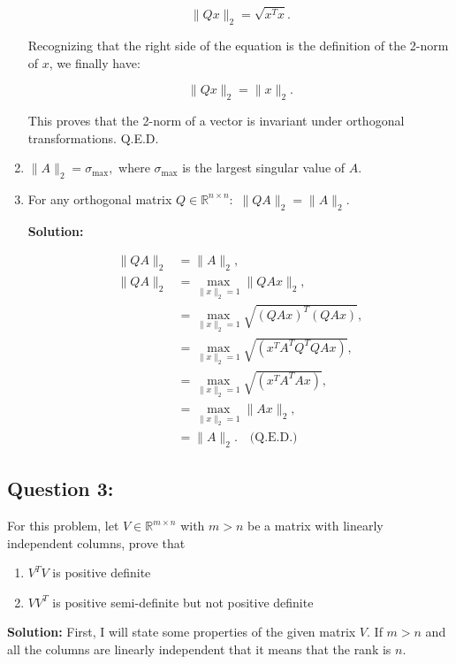 \documentclass[11pt,onecolumn]{article}
\newcommand{\R}{\mathbb{R}}
\begin{document}
\begin{enumerate}
\[
\|Qx\|_2 = \sqrt{x^T x}.
\]

Recognizing that the right side of the equation is the definition of the 2-norm of \( x \), we finally have:

\[
\|Qx\|_2 = \|x\|_2.
\]

This proves that the 2-norm of a vector is invariant under orthogonal transformations. Q.E.D.





\item $\|A\|_2 = \sigma_{\max},$ where $\sigma_{\max}$ is the largest singular value of $A.$
\item For any orthogonal matrix $Q\in \R^{n\times n}:$ $\|QA\|_2 = \|A\|_2.$



\textbf{Solution:}

\begin{align*}
\|QA\|_{2} &= \|A\|_{2}, \\
\|QA\|_{2} &= \max_{\|x\|_{2}=1} \|QAx\|_{2}, \\
&= \max_{\|x\|_{2}=1} \sqrt{(QAx)^T(QAx)}, \\
&= \max_{\|x\|_{2}=1} \sqrt{(x^T A^T Q^T QAx)}, \\
&= \max_{\|x\|_{2}=1} \sqrt{(x^T A^T A x)}, \\
&= \max_{\|x\|_{2}=1} \|Ax\|_{2}, \\
&= \|A\|_{2}. \quad \text{(Q.E.D.)}
\end{align*}






\end{enumerate}

\subsection*{Question 3:}
For this problem, let $V\in \R^{m \times n}$ with $m > n$ be a matrix with linearly independent columns, prove that
\begin{enumerate}
\item $V^TV$ is positive definite
\item $VV^T$ is positive semi-definite but not positive definite
\end{enumerate}

\textbf{Solution:} First, I will state some properties of the given matrix $V$. If $m > n$ and all the columns are linearly independent that it means that the rank is $n$.
\end{document}
